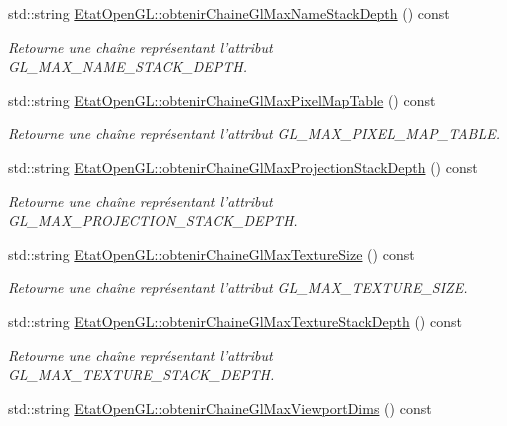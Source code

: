 \begin{DoxyCompactItemize}
std\-::string \hyperlink{group__utilitaire_gad22c079b7e29e5cfb6ee2fe9bb220816}{Etat\-Open\-G\-L\-::obtenir\-Chaine\-Gl\-Max\-Name\-Stack\-Depth} () const 
\begin{DoxyCompactList}\small\item\em Retourne une chaîne représentant l'attribut G\-L\-\_\-\-M\-A\-X\-\_\-\-N\-A\-M\-E\-\_\-\-S\-T\-A\-C\-K\-\_\-\-D\-E\-P\-T\-H. \end{DoxyCompactList}\item 
std\-::string \hyperlink{group__utilitaire_ga266533ff4a35f65c19be95594d07f435}{Etat\-Open\-G\-L\-::obtenir\-Chaine\-Gl\-Max\-Pixel\-Map\-Table} () const 
\begin{DoxyCompactList}\small\item\em Retourne une chaîne représentant l'attribut G\-L\-\_\-\-M\-A\-X\-\_\-\-P\-I\-X\-E\-L\-\_\-\-M\-A\-P\-\_\-\-T\-A\-B\-L\-E. \end{DoxyCompactList}\item 
std\-::string \hyperlink{group__utilitaire_ga8c2d3530aa09867d9c01d8433839011e}{Etat\-Open\-G\-L\-::obtenir\-Chaine\-Gl\-Max\-Projection\-Stack\-Depth} () const 
\begin{DoxyCompactList}\small\item\em Retourne une chaîne représentant l'attribut G\-L\-\_\-\-M\-A\-X\-\_\-\-P\-R\-O\-J\-E\-C\-T\-I\-O\-N\-\_\-\-S\-T\-A\-C\-K\-\_\-\-D\-E\-P\-T\-H. \end{DoxyCompactList}\item 
std\-::string \hyperlink{group__utilitaire_gaeba7eaad6682c2c4aa8925501601c606}{Etat\-Open\-G\-L\-::obtenir\-Chaine\-Gl\-Max\-Texture\-Size} () const 
\begin{DoxyCompactList}\small\item\em Retourne une chaîne représentant l'attribut G\-L\-\_\-\-M\-A\-X\-\_\-\-T\-E\-X\-T\-U\-R\-E\-\_\-\-S\-I\-Z\-E. \end{DoxyCompactList}\item 
std\-::string \hyperlink{group__utilitaire_ga9aac1a0891487831a30125fca75bec93}{Etat\-Open\-G\-L\-::obtenir\-Chaine\-Gl\-Max\-Texture\-Stack\-Depth} () const 
\begin{DoxyCompactList}\small\item\em Retourne une chaîne représentant l'attribut G\-L\-\_\-\-M\-A\-X\-\_\-\-T\-E\-X\-T\-U\-R\-E\-\_\-\-S\-T\-A\-C\-K\-\_\-\-D\-E\-P\-T\-H. \end{DoxyCompactList}\item 
std\-::string \hyperlink{group__utilitaire_ga0dad12ef08cd32b9fb94e214f00a95a9}{Etat\-Open\-G\-L\-::obtenir\-Chaine\-Gl\-Max\-Viewport\-Dims} () const 

\end{DoxyCompactItemize}
